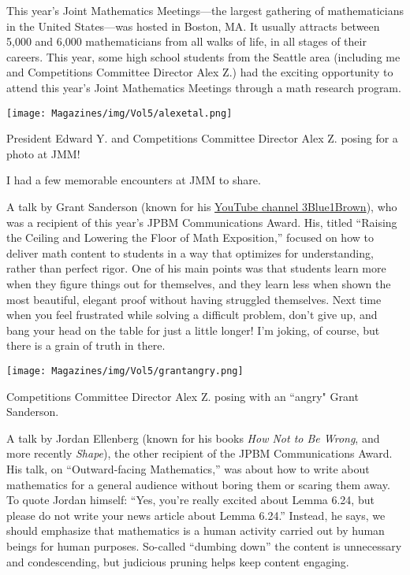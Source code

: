\documentclass{article}
\begin{document}
\begin{multicols}{3}
This year’s Joint Mathematics Meetings—the largest gathering of mathematicians in the United States—was hosted in Boston, MA. It usually attracts between 5,000 and 6,000 mathematicians from all walks of life, in all stages of their careers. This year, some high school students from the Seattle area (including me and Competitions Committee Director Alex Z.) had the exciting opportunity to attend this year’s Joint Mathematics Meetings through a math research program.

\begin{center}
    \footnotesize
    \texttt{[image: Magazines/img/Vol5/alexetal.png]}
    
    President Edward Y. and Competitions Committee Director Alex Z. posing for a photo at JMM!
\end{center}

I had a few memorable encounters at JMM to share.

A talk by Grant Sanderson (known for his \href{https://www.youtube.com/@3blue1brown}{YouTube channel 3Blue1Brown}), who was a recipient of this year’s JPBM Communications Award. His, titled “Raising the Ceiling and Lowering the Floor of Math Exposition,” focused on how to deliver math content to students in a way that optimizes for understanding, rather than perfect rigor. One of his main points was that students learn more when they figure things out for themselves, and they learn less when shown the most beautiful, elegant proof without having struggled themselves. Next time when you feel frustrated while solving a difficult problem, don’t give up, and bang your head on the table for just a little longer! I’m joking, of course, but there is a grain of truth in there.

\begin{center}
    \footnotesize
    \texttt{[image: Magazines/img/Vol5/grantangry.png]}
    
    Competitions Committee Director Alex Z. posing with an ``angry" Grant Sanderson.
\end{center}

A talk by Jordan Ellenberg (known for his books \textit{How Not to Be Wrong}, and more recently \textit{Shape}), the other recipient of the JPBM Communications Award. His talk, on “Outward-facing Mathematics,” was about how to write about mathematics for a general audience without boring them or scaring them away. To quote Jordan himself: “Yes, you’re really excited about Lemma 6.24, but please do not write your news article about Lemma 6.24.” Instead, he says, we should emphasize that mathematics is a human activity carried out by human beings for human purposes. So-called “dumbing down” the content is unnecessary and condescending, but judicious pruning helps keep content engaging.


\end{multicols}
\end{document}
